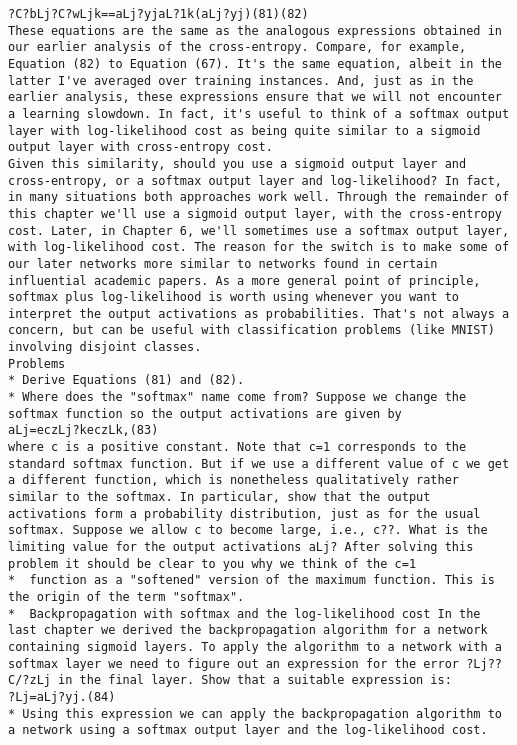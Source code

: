 \begin{lstlisting}
?C?bLj?C?wLjk==aLj?yjaL?1k(aLj?yj)(81)(82)
These equations are the same as the analogous expressions obtained in our earlier analysis of the cross-entropy. Compare, for example, Equation (82) to Equation (67). It's the same equation, albeit in the latter I've averaged over training instances. And, just as in the earlier analysis, these expressions ensure that we will not encounter a learning slowdown. In fact, it's useful to think of a softmax output layer with log-likelihood cost as being quite similar to a sigmoid output layer with cross-entropy cost.
Given this similarity, should you use a sigmoid output layer and cross-entropy, or a softmax output layer and log-likelihood? In fact, in many situations both approaches work well. Through the remainder of this chapter we'll use a sigmoid output layer, with the cross-entropy cost. Later, in Chapter 6, we'll sometimes use a softmax output layer, with log-likelihood cost. The reason for the switch is to make some of our later networks more similar to networks found in certain influential academic papers. As a more general point of principle, softmax plus log-likelihood is worth using whenever you want to interpret the output activations as probabilities. That's not always a concern, but can be useful with classification problems (like MNIST) involving disjoint classes.
Problems
* Derive Equations (81) and (82).
* Where does the "softmax" name come from? Suppose we change the softmax function so the output activations are given by 
aLj=eczLj?keczLk,(83)
where c is a positive constant. Note that c=1 corresponds to the standard softmax function. But if we use a different value of c we get a different function, which is nonetheless qualitatively rather similar to the softmax. In particular, show that the output activations form a probability distribution, just as for the usual softmax. Suppose we allow c to become large, i.e., c??. What is the limiting value for the output activations aLj? After solving this problem it should be clear to you why we think of the c=1
*  function as a "softened" version of the maximum function. This is the origin of the term "softmax".
*  Backpropagation with softmax and the log-likelihood cost In the last chapter we derived the backpropagation algorithm for a network containing sigmoid layers. To apply the algorithm to a network with a softmax layer we need to figure out an expression for the error ?Lj??C/?zLj in the final layer. Show that a suitable expression is: 
?Lj=aLj?yj.(84)
* Using this expression we can apply the backpropagation algorithm to a network using a softmax output layer and the log-likelihood cost.

\end{lstlisting}
